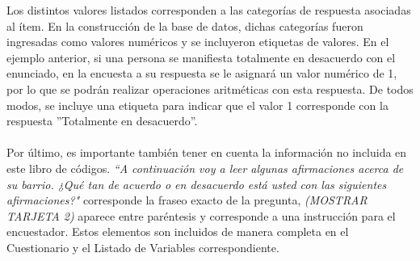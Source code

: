 \documentclass[12pt]{report}
\begin{document}
Los distintos valores listados corresponden a las categorías de respuesta asociadas al ítem. En la construcción de la base de datos, dichas categorías fueron ingresadas como valores numéricos y se incluyeron etiquetas de valores. En el ejemplo anterior, si una persona se manifiesta totalmente en desacuerdo con el enunciado, en la encuesta a su respuesta se le asignará un valor numérico de 1, por lo que se podrán realizar operaciones aritméticas con esta respuesta. De todos modos, se incluye una etiqueta para indicar que el valor 1 corresponde con la respuesta ''Totalmente en desacuerdo''.\\

\noindent {}
\vspace{0.1cm}\\



Por último, es importante también tener en cuenta la información no incluida en este libro de códigos. \textit{``A continuación voy a leer algunas afirmaciones acerca de su barrio. ¿Qué tan de acuerdo o en desacuerdo está usted con las siguientes afirmaciones?"} corresponde la fraseo exacto de la pregunta, \textit{(MOSTRAR TARJETA 2)} aparece entre paréntesis y corresponde a una instrucción para el encuestador. Estos elementos son incluidos de manera completa en el Cuestionario y el Listado de Variables correspondiente.\\
\end{document}
